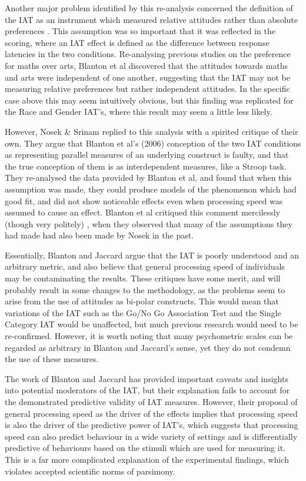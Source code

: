 Another major problem identified by this re-analysis concerned the definition of the IAT as an instrument which measured relative attitudes rather than absolute preferences \cite{Greenwald1998} . This assumption was so important that it was reflected in the scoring, where an IAT effect is defined as the difference between response latencies in the two conditions. Re-analysing previous studies on the preference for maths over arts, Blanton et al discovered that the attitudes towards maths and arts were independent of one another, suggesting that the IAT may not be measuring relative preferences but rather independent attitudes. In the specific case above this may seem intuitively obvious, but this finding was replicated for the Race and Gender IAT's, where this result may seem a little less likely. 

However, Nosek \& Srinam \cite{Nosek2007} replied to this analysis with a spirited critique of their own. They argue that Blanton et al's (2006) conception of the two IAT conditions as representing parallel measures of an underlying construct is faulty, and that the true conception of them is as interdependent measures, like a Stroop task. They re-analysed the data provided by Blanton et al, and found that when this assumption was made, they could produce models of the phenomenon which had good fit, and did not show noticeable effects even when processing speed was assumed to cause an effect. Blanton et al critiqued this comment mercilessly (though very politely) \cite{Blanton2007}, when they observed that many of the assumptions they had made had also been made by Nosek in the past. 

Essentially, Blanton and Jaccard argue that the IAT is poorly understood and an arbitrary metric, and also believe that general processing speed of individuals may be contaminating the results. These critiques have some merit, and will probably result in some changes to the methodology, as the problems seem to arise from the use of attitudes as bi-polar constructs. This would mean that variations of the IAT such as the Go/No Go Association Test and the Single Category IAT would be unaffected, but much previous research would need to be re-confirmed. However, it is worth noting that many psychometric scales can be regarded as arbitrary in Blanton and Jaccard's sense, yet they do not condemn the use of these measures. 

The work of Blanton and Jaccard has provided important caveats and insights into potential moderators of the IAT, but their explanation fails to account for the demonstrated predictive validity of IAT measures\cite{Richetin2007,Arcuri2008,Greenwald2000}. However, their proposal of general processing speed as the driver of the effects implies that processing speed is also the driver of the predictive power of IAT's, which suggests that processing speed can also predict behaviour in a wide variety of settings and is differentially predictive of behaviours based on the stimuli which are used for measuring it. This is a far more complicated explanation of the experimental findings, which violates accepted scientific norms of parsimony. 

